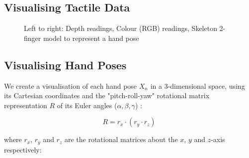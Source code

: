 \documentclass[11pt, a4paper]{report}
\begin{document}
\subsection{Visualising Tactile Data}
\label{sec:4.3.1}
\begin{figure}[H]%
    \centering
    \qquad
    \caption{Left to right: Depth readings, Colour (RGB) readings, Skeleton 2-finger model to represent a hand pose}
    \label{fig:4.3}%
\end{figure}


\subsection{Visualising Hand Poses}
\label{sec:4.3.2}
We create a visualisation of each hand pose $X_n$ in a 3-dimensional space, using its Cartesian coordinates and the "pitch-roll-yaw" rotational matrix representation $R$ of its Euler angles ($\alpha,\beta,\gamma$) \cite{weisstein}:

\begin{equation}
    R=r_x\cdot(r_y\cdot r_z)
\end{equation}

\noindent where $r_x$, $r_y$ and $r_z$ are the rotational matrices about the $x$, $y$ and $z$-axis respectively:
\end{document}
